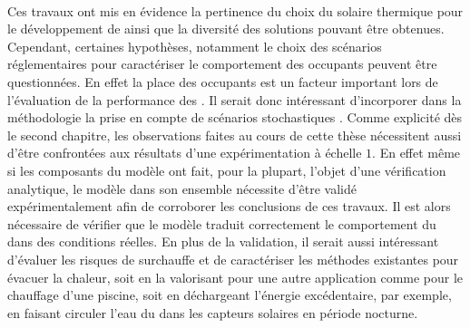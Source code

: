 \paragraph{} %
Ces travaux ont mis en évidence la pertinence du choix du solaire thermique pour le
développement de  ainsi que la diversité des solutions pouvant être obtenues.
Cependant, certaines hypothèses, notamment le choix des scénarios réglementaires pour
caractériser le comportement des occupants peuvent être questionnées. En effet la place des
occupants est un facteur important lors de l’évaluation de la performance des .
Il serait donc intéressant d’incorporer dans la méthodologie la prise en compte de scénarios
stochastiques \parencite{Vorger2014}.
Comme explicité dès le second chapitre, les observations faites au cours de cette thèse
nécessitent aussi d’être confrontées aux résultats d’une expérimentation à échelle $1$. En
effet même si les composants du modèle ont fait, pour la plupart, l’objet d’une
vérification analytique, le modèle dans son ensemble nécessite d’être validé
expérimentalement afin de corroborer les conclusions de ces travaux. Il est alors
nécessaire de vérifier que le modèle traduit correctement le comportement du 
dans des conditions réelles. En plus de la validation, il serait aussi intéressant
d’évaluer les risques de surchauffe et de caractériser les méthodes existantes pour
évacuer la chaleur, soit en la valorisant pour une autre application comme pour le
chauffage d’une piscine, soit en déchargeant l’énergie excédentaire, par exemple, en
faisant circuler l’eau du  dans les capteurs solaires en période nocturne.


